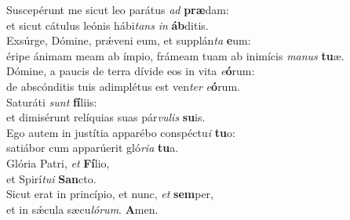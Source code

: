 \oddverse Suscepérunt me sicut leo parátus \textit{ad} \textbf{præ}dam:~\*\\
\oddverse et sicut cátulus leónis hábi\textit{tans} \textit{in} \textbf{áb}ditis.\\
\evenverse Exsúrge, Dómine, prǽveni eum, et supplán\textit{ta} \textbf{e}um:~\*\\
\evenverse éripe ánimam meam ab ímpio, frámeam tuam ab inimícis \textit{ma}\textit{nus} \textbf{tu}æ.\\
\oddverse Dómine, a paucis de terra dívide eos in vita \textit{e}\textbf{ó}rum:~\*\\
\oddverse de abscónditis tuis adimplétus est ven\textit{ter} \textit{e}\textbf{ó}rum.\\
\evenverse Saturáti \textit{sunt} \textbf{fí}liis:~\*\\
\evenverse et dimisérunt relíquias suas pár\textit{vu}\textit{lis} \textbf{su}is.\\
\oddverse Ego autem in justítia apparébo conspéctu\textit{i} \textbf{tu}o:~\*\\
\oddverse satiábor cum apparúerit gló\textit{ri}\textit{a} \textbf{tu}a.\\
\evenverse Glória Patri, \textit{et} \textbf{Fí}lio,~\*\\
\evenverse et Spirí\textit{tu}\textit{i} \textbf{San}cto.\\
\oddverse Sicut erat in princípio, et nunc, \textit{et} \textbf{sem}per,~\*\\
\oddverse et in sǽcula sæcu\textit{ló}\textit{rum}. \textbf{A}men.\\
